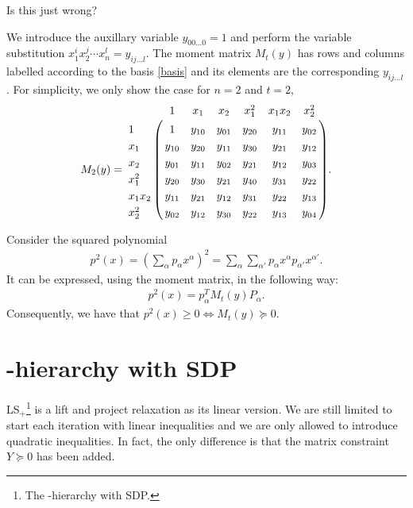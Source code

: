 \documentclass[a4paper,twoside,justified]{tufte-handout}
\begin{document}
{\Huge Is this just wrong?}

We introduce the auxillary variable $y_{00\ldots 0}=1$ and perform the variable substitution $x_1^ix_2^j\cdots x_n^l=y_{ij\ldots l}$. The moment matrix $M_t(y)$ has rows and columns labelled according to the basis \eqref{basis} and its elements are the corresponding $y_{ij\ldots l}$. For simplicity, we only show the case for $n=2$ and $t=2$, 
\begin{eqnarray*}
M_2(y)=
\bordermatrix{~ & 1            & x_1     &x_2      &x_1^2 &x_1x_2&x_2^2 \cr
                         1 & 1           & y_{10} & y_{01}&y_{20}&y_{11}&y_{02} \cr
                     x_1 & y_{10}  & y_{20} & y_{11}&y_{30}&y_{21}&y_{12} \cr
                     x_2 & y_{01}  & y_{11} & y_{02}&y_{21}&y_{12}&y_{03} \cr
                x_1^2 & y_{20}  & y_{30} & y_{21}&y_{40}&y_{31}&y_{22} \cr
             x_1x_2  & y_{11}  & y_{21} & y_{12}&y_{31}&y_{22}&y_{13} \cr
            x_2^2     & y_{02}  & y_{12} & y_{30}&y_{22}&y_{13}&y_{04} \cr}.
\end{eqnarray*}

Consider the squared polynomial
\begin{eqnarray*}
p^2(x)=(\sum_{\alpha}p_{\alpha}x^{\alpha})^2=\sum_{\alpha}\sum_{\alpha'}p_{\alpha}x^{\alpha}p_{\alpha'}x^{\alpha'}.
\end{eqnarray*}
It can be expressed, using the moment matrix, in the following way:
\begin{eqnarray*}
p^2(x)=p_{\alpha}^TM_t(y)P_{\alpha}.
\end{eqnarray*}
Consequently, we have that $p^2(x)\geq0\Leftrightarrow M_t(y)\succeq0$.

\section{\Lovasz-\Schrijver hierarchy with SDP}
 LS$_+$\footnote{The \Lovasz-\Schrijver hierarchy with SDP.} is a lift and project relaxation as its linear version. We are still limited to start each iteration with linear inequalities and we are only allowed to introduce quadratic inequalities. In fact, the only difference is that the matrix constraint $Y\succeq0$ has been added.
\end{document}
